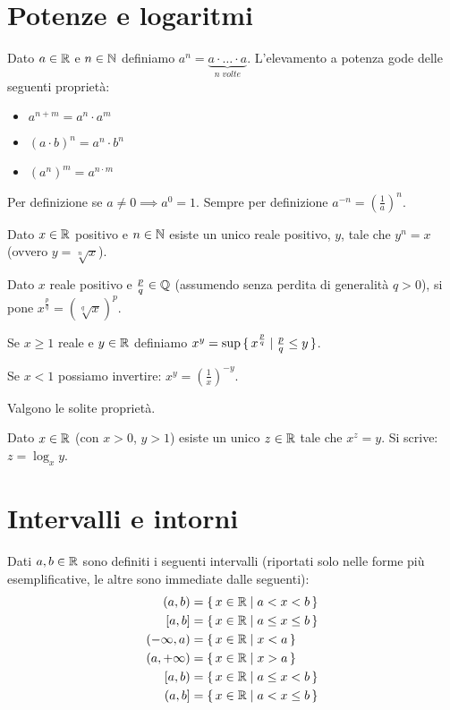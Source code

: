 \section{Potenze e logaritmi}

Dato $a \in \mathbb R$ e $n \in \mathbb N$ definiamo $a^n = \underbrace{a \cdot \ldots \cdot a}_{n\;volte}$. L'elevamento a potenza gode delle seguenti proprietà:
\begin{itemize}
\item $a^{n+m} = a^n \cdot a^m$
\item $(a \cdot b)^n = a^n \cdot b^n$
\item $(a^n)^m = a^{n \cdot m}$
\end{itemize}

Per definizione se $a \neq 0 \implies a^0 = 1$. Sempre per definizione $a^{-n} = (\frac{1}{a})^n$.

\begin{theorem}
Dato $x \in \mathbb R$ positivo e $n \in \mathbb N$ esiste un unico reale positivo, $y$, tale che $y^n = x$ (ovvero $y = \sqrt[n]{x}$).
\end{theorem}

\begin{definition}
Dato $x$ reale positivo e $\frac{p}{q} \in \mathbb Q$ (assumendo senza perdita di generalità $q > 0$), si pone $x^{\frac{p}{q}} = (\sqrt[q]{x})^p$.

Se $x \ge 1$ reale e $y \in \mathbb R$ definiamo $x^y = \sup \set{x^\frac{p}{q} | \frac{p}{q} \le y}$.

Se $x < 1$ possiamo invertire: $x^y = (\frac{1}{x})^{-y}$.

Valgono le solite proprietà.
\end{definition}

\begin{theorem}
Dato $x \in \mathbb R$ (con $x > 0$, $y > 1$) esiste un unico $z \in \mathbb R$ tale che $x^z = y$. Si scrive: $z = \log_x y$.
\end{theorem}

\section{Intervalli e intorni}
Dati $a, b \in \mathbb R$ sono definiti i seguenti intervalli (riportati solo nelle forme più esemplificative, le altre sono immediate dalle seguenti):
\begin{align*}
(a,b) &= \set{x \in \R | a < x < b} \\
[a,b] &= \set{x \in \R | a \le x \le b} \\
(-\infty,a) &= \set{x \in \R | x < a} \\
(a, +\infty) &= \set{x \in \R | x > a} \\
[a,b) &= \set{x \in \R | a \le x < b} \\
(a,b] &= \set{x \in \R | a < x \le b}
\end{align*}

